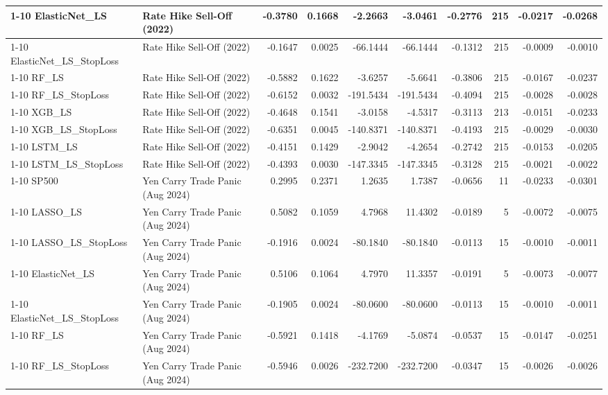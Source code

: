 \begin{tabular}{llrrrrrrrr}
\cline{1-10}
ElasticNet\_LS & Rate Hike Sell-Off (2022) & -0.3780 & 0.1668 & -2.2663 & -3.0461 & -0.2776 & 215 & -0.0217 & -0.0268 \\
\cline{1-10}
ElasticNet\_LS\_StopLoss & Rate Hike Sell-Off (2022) & -0.1647 & 0.0025 & -66.1444 & -66.1444 & -0.1312 & 215 & -0.0009 & -0.0010 \\
\cline{1-10}
RF\_LS & Rate Hike Sell-Off (2022) & -0.5882 & 0.1622 & -3.6257 & -5.6641 & -0.3806 & 215 & -0.0167 & -0.0237 \\
\cline{1-10}
RF\_LS\_StopLoss & Rate Hike Sell-Off (2022) & -0.6152 & 0.0032 & -191.5434 & -191.5434 & -0.4094 & 215 & -0.0028 & -0.0028 \\
\cline{1-10}
XGB\_LS & Rate Hike Sell-Off (2022) & -0.4648 & 0.1541 & -3.0158 & -4.5317 & -0.3113 & 213 & -0.0151 & -0.0233 \\
\cline{1-10}
XGB\_LS\_StopLoss & Rate Hike Sell-Off (2022) & -0.6351 & 0.0045 & -140.8371 & -140.8371 & -0.4193 & 215 & -0.0029 & -0.0030 \\
\cline{1-10}
LSTM\_LS & Rate Hike Sell-Off (2022) & -0.4151 & 0.1429 & -2.9042 & -4.2654 & -0.2742 & 215 & -0.0153 & -0.0205 \\
\cline{1-10}
LSTM\_LS\_StopLoss & Rate Hike Sell-Off (2022) & -0.4393 & 0.0030 & -147.3345 & -147.3345 & -0.3128 & 215 & -0.0021 & -0.0022 \\
\cline{1-10}
SP500 & Yen Carry Trade Panic (Aug 2024) & 0.2995 & 0.2371 & 1.2635 & 1.7387 & -0.0656 & 11 & -0.0233 & -0.0301 \\
\cline{1-10}
LASSO\_LS & Yen Carry Trade Panic (Aug 2024) & 0.5082 & 0.1059 & 4.7968 & 11.4302 & -0.0189 & 5 & -0.0072 & -0.0075 \\
\cline{1-10}
LASSO\_LS\_StopLoss & Yen Carry Trade Panic (Aug 2024) & -0.1916 & 0.0024 & -80.1840 & -80.1840 & -0.0113 & 15 & -0.0010 & -0.0011 \\
\cline{1-10}
ElasticNet\_LS & Yen Carry Trade Panic (Aug 2024) & 0.5106 & 0.1064 & 4.7970 & 11.3357 & -0.0191 & 5 & -0.0073 & -0.0077 \\
\cline{1-10}
ElasticNet\_LS\_StopLoss & Yen Carry Trade Panic (Aug 2024) & -0.1905 & 0.0024 & -80.0600 & -80.0600 & -0.0113 & 15 & -0.0010 & -0.0011 \\
\cline{1-10}
RF\_LS & Yen Carry Trade Panic (Aug 2024) & -0.5921 & 0.1418 & -4.1769 & -5.0874 & -0.0537 & 15 & -0.0147 & -0.0251 \\
\cline{1-10}
RF\_LS\_StopLoss & Yen Carry Trade Panic (Aug 2024) & -0.5946 & 0.0026 & -232.7200 & -232.7200 & -0.0347 & 15 & -0.0026 & -0.0026 \\

\end{tabular}

